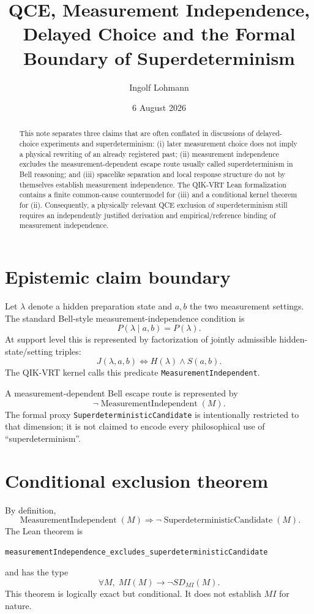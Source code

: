 \documentclass[11pt,a4paper]{article}
\title{QCE, Measurement Independence, Delayed Choice and the Formal Boundary of Superdeterminism}
\author{Ingolf Lohmann}
\date{6 August 2026}
\begin{document}
\maketitle

\begin{abstract}
This note separates three claims that are often conflated in discussions of delayed-choice experiments and superdeterminism: (i) later measurement choice does not imply a physical rewriting of an already registered past; (ii) measurement independence excludes the measurement-dependent escape route usually called superdeterminism in Bell reasoning; and (iii) spacelike separation and local response structure do not by themselves establish measurement independence.  The QIK-VRT Lean formalization contains a finite common-cause countermodel for (iii) and a conditional kernel theorem for (ii).  Consequently, a physically relevant QCE exclusion of superdeterminism still requires an independently justified derivation and empirical/reference binding of measurement independence.
\end{abstract}

\section{Epistemic claim boundary}
Let $\lambda$ denote a hidden preparation state and $a,b$ the two measurement settings.  The standard Bell-style measurement-independence condition is
\[
P(\lambda\mid a,b)=P(\lambda).
\]
At support level this is represented by factorization of jointly admissible hidden-state/setting triples:
\[
J(\lambda,a,b)\iff H(\lambda)\land S(a,b).
\]
The QIK-VRT kernel calls this predicate \texttt{MeasurementIndependent}.

A measurement-dependent Bell escape route is represented by
\[
\neg\operatorname{MeasurementIndependent}(M).
\]
The formal proxy \texttt{SuperdeterministicCandidate} is intentionally restricted to that dimension; it is not claimed to encode every philosophical use of ``superdeterminism''.

\section{Conditional exclusion theorem}
By definition,
\[
\operatorname{MeasurementIndependent}(M)
\Longrightarrow
\neg\operatorname{SuperdeterministicCandidate}(M).
\]
The Lean theorem is
\begin{verbatim}
measurementIndependence_excludes_superdeterministicCandidate
\end{verbatim}
and has the type
\[
\forall M,\; MI(M)\to\neg SD_{MI}(M).
\]
This theorem is logically exact but conditional.  It does not establish $MI$ for nature.
\end{document}
